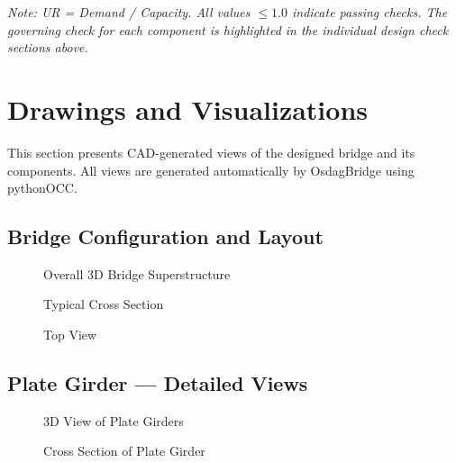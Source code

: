\documentclass[12pt,a4paper]{report}
\numberwithin{table}{chapter}
\numberwithin{figure}{chapter}
\begin{document}
\noindent\textit{Note: UR = Demand / Capacity. All values $\leq 1.0$ indicate passing checks. The governing check for each component is highlighted in the individual design check sections above.}



\chapter{Drawings and Visualizations}
\label{ch:drawings}

This section presents CAD-generated views of the designed bridge and its components. All views are generated automatically by OsdagBridge using pythonOCC.

\section{Bridge Configuration and Layout}
\label{sec:bridge-layout}

\begin{figure}[H]
\centering
{}
\caption{Overall 3D Bridge Superstructure}
\label{fig:bridge-3d}
\end{figure}


\begin{figure}[H]
\centering
{}
\caption{Typical Cross Section}
\label{fig:cross-section}
\end{figure}


\begin{figure}[H]
\centering
{}
\caption{Top View}
\label{fig:top-view}
\end{figure}


\section{Plate Girder --- Detailed Views}
\label{sec:girder-views}

\begin{figure}[H]
\centering
{}
\caption{3D View of Plate Girders}
\label{fig:girder-3d}
\end{figure}


\begin{figure}[H]
\centering
{}
\caption{Cross Section of Plate Girder}
\label{fig:girder-xsec}
\end{figure}
\end{document}
